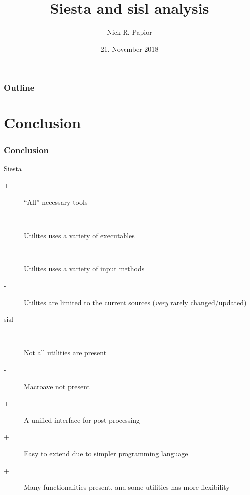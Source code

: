 

\graphicspath{{fig/}}


\date{21. November 2018}
\title{Siesta and sisl analysis}
\author{Nick R. Papior}



\begin{frame}
  \titlepage
\end{frame}

\begin{frame}
  \frametitle{Outline}
  \tableofcontents
\end{frame}




\section{Conclusion}

\begin{frame}
  \frametitle{Conclusion}

  \begin{block}{Siesta}
    \begin{description}
      \item[+] ``All'' necessary tools
      \item[-] Utilites uses a variety of executables
      \item[-] Utilites uses a variety of input methods
      \item[-] Utilites are limited to the current sources (\emph{very} rarely changed/updated)
    \end{description}
  \end{block}

  \begin{block}{sisl}
    \begin{description}
      \item[-] Not all utilities are present
      \item[-] Macroave not present
      \item[+] A unified interface for post-processing
      \item[+] Easy to extend due to simpler programming language
      \item[+] Many functionalities present, and some utilities has more flexibility
    \end{description}
  \end{block}
  
\end{frame}


